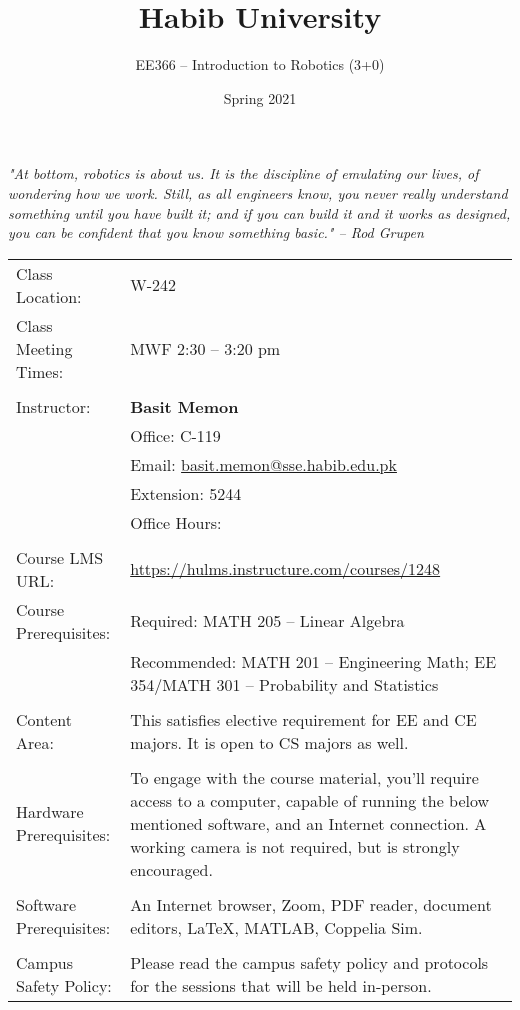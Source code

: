 \documentclass[a4paper,11pt]{article}
\title{Habib University}
\author{EE366 -- Introduction to Robotics (3+0)}
\date{Spring 2021}
\begin{document}
\maketitle
\textit{"At bottom, robotics is about us. It is the discipline of emulating our lives, of wondering how we work. Still, as all engineers know, you never really understand something until you have built it; and if you can build it and it works as designed, you can be confident that you know something basic." -- Rod Grupen}\\

\renewcommand{\arraystretch}{1}
\begin{tabular}{p{} p{}}
	Class Location: & W-242\\
	Class Meeting Times: & MWF 2:30 -- 3:20 pm\\\\
	Instructor:	 & \textbf{Basit Memon}\\
				 & Office:  C-119\\
				 & Email: \href{mailto:basit.memon@sse.habib.edu.pk}{ basit.memon@sse.habib.edu.pk} \\
				 & Extension:  5244\\
				 & Office Hours: \\\\
	Course LMS URL: & \url{https://hulms.instructure.com/courses/1248}\\
	Course Prerequisites: & Required: MATH 205 -- Linear Algebra \\	
						& Recommended: MATH 201 -- Engineering Math; EE 354/MATH 301 -- Probability and Statistics\\\\

	Content Area: & This satisfies elective requirement for EE and CE majors. It is open to CS majors as well.\\\\
	Hardware Prerequisites: & To engage with the course material, you'll require access to a computer, capable of running the below mentioned software, and an Internet connection. A working camera is not required, but is strongly encouraged.\\\\
	Software Prerequisites: & An Internet browser, Zoom, PDF reader, document editors, LaTeX, MATLAB, Coppelia Sim. \\\\
	Campus Safety Policy: & Please read the campus safety policy and protocols for the sessions that will be held in-person.
\end{tabular}
\end{document}
